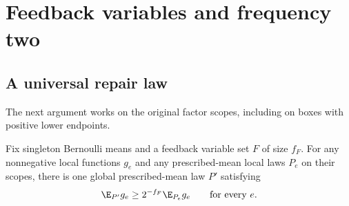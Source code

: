\section{Feedback variables and frequency two}\label{sec:frequency}
\subsection{A universal repair law}
The next argument works on the original factor scopes, including on boxes
with positive lower endpoints.

\begin{lemma}\label{lem:feedback-repair}
Fix singleton Bernoulli means and a feedback variable set $F$ of size
$f_F$. For any nonnegative local functions $g_e$ and any prescribed-mean
local laws $P_e$ on their scopes, there is one global prescribed-mean law
$P'$ satisfying
\[
 \E_{P'}g_e\ge2^{-f_F}\E_{P_e}g_e\qquad\hbox{for every }e.
\]
\end{lemma}
